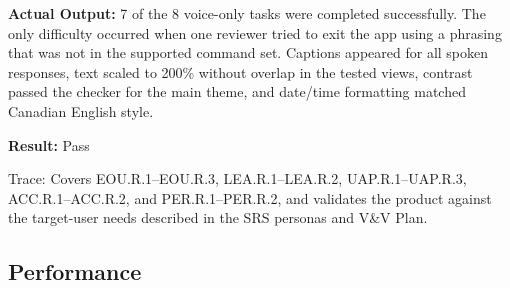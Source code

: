 \documentclass[12pt]{article}
\begin{document}
\begin{enumerate}
    \textbf{Actual Output:} 7 of the 8 voice-only tasks were completed
    successfully. The only difficulty occurred when one reviewer tried
    to exit the app using a phrasing that was not in the supported
    command set. Captions appeared for all spoken responses, text
    scaled to 200\% without overlap in the tested views, contrast
    passed the checker for the main theme, and date/time formatting
    matched Canadian English style.
    
    \textbf{Result:} Pass
\end{enumerate}

\noindent Trace: Covers EOU.R.1--EOU.R.3, LEA.R.1--LEA.R.2,
UAP.R.1--UAP.R.3, ACC.R.1--ACC.R.2, and PER.R.1--PER.R.2,
and validates the product against the target-user needs described
in the SRS personas and V\&V Plan.


\subsection{Performance}
\end{document}
